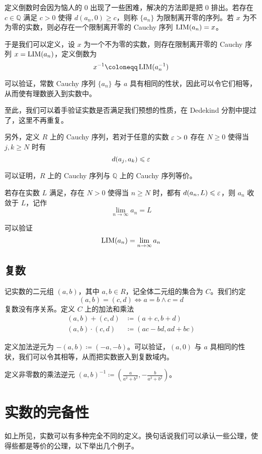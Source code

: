 定义倒数时会因为恼人的 $0$ 出现了一些困难，解决的方法即是把 $0$ 排出。若存在 $c\in \mathbb{Q}$ 满足 $c > 0$ 使得 $d(a_n,0) \geqslant c$，则称 $\{a_n\}$ 为限制离开零的序列。若 $x$ 为不为零的实数，则必存在一个限制离开零的 Cauchy 序列 $\operatorname{{LIM}}(a_n) = x$。

于是我们可以定义，设 $x$ 为一个不为零的实数，则存在限制离开零的 Cauchy 序列 $x=\operatorname{{LIM}}(a_n)$，定义倒数为
\[ x^{-1} \coloneqq  \LIM(a_n^{-1})\]

可以验证，常数 Cauchy 序列 $\{a_n\}$ 与 $a$ 具有相同的性状，因此可以令它们相等，从而使有理数嵌入到实数中。

至此，我们可以着手验证实数是否满足我们预想的性质，在 Dedekind 分割中提过了，这里不再重复。

另外，定义 $R$ 上的 Cauchy 序列，若对于任意的实数 $\varepsilon > 0$ 存在 $N \geqslant 0$ 使得当 $j,k \geqslant N$ 时有
\[ d(a_j,a_k) \leqslant \varepsilon\]

可以证明，$R$ 上的 Cauchy 序列与 $\mathbb{Q}$ 上的 Cauchy 序列等价。

若存在实数 $L$ 满足，存在 $N>0$ 使得当 $n \geqslant N$ 时，都有 $d(a_n,L) \leqslant \varepsilon$，则 $a_n$ 收敛于 $L$，记作
\[ \lim_{n\to \infty} a_n = L\]

可以验证
\[ \operatorname{{LIM}}(a_n) = \lim_{n\to \infty} a_n\]

\subsection{复数}

记实数的二元组 $(a,b)$，其中 $a,b\in R$，记全体二元组的集合为 $C$。我们约定
\[(a,b) = (c,d) \Leftrightarrow a=b \land  c=d\]
复数没有序关系。定义 $C$ 上的加法和乘法
\[\begin{aligned}
		(a,b) + (c,d)     & \coloneqq  (a+c,b+d)     \\
		(a,b) \cdot (c,d) & \coloneqq  (ac-bd,ad+bc)
	\end{aligned}\]

定义加法逆元为 $-(a,b) \coloneqq  (-a,-b)$。可以验证，$(a,0)$ 与 $a$ 具相同的性状，我们可以令其相等，从而把实数嵌入到复数域内。

定义非零数的乘法逆元 $(a,b)^{-1} \coloneqq  \left(\frac{a}{a^2+b^2},-\frac{b}{a^2+b^2}\right)$。

\section{实数的完备性}

如上所见，实数可以有多种完全不同的定义。换句话说我们可以承认一些公理，使得些都是等价的公理，以下举出几个例子。

